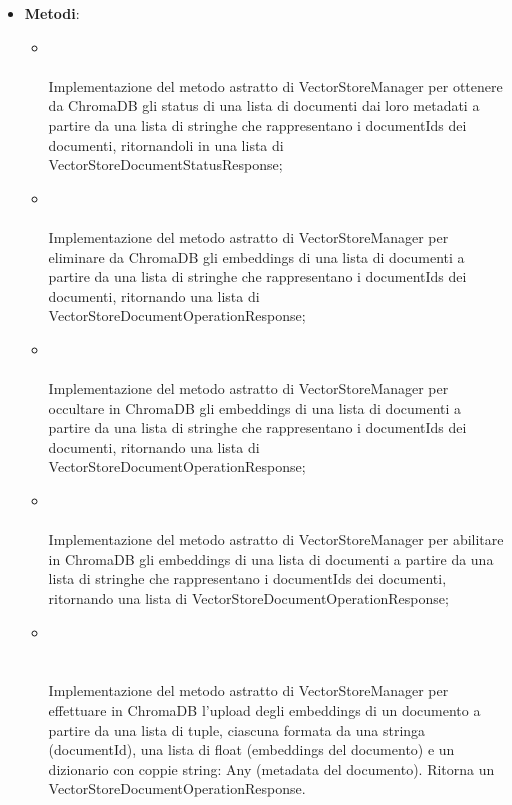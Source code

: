 \documentclass[10pt, a4paper]{article}
\begin{document}
    \label{VectorStoreChromaDBManagerDettaglio}
    \begin{itemize}
        \item \textbf{Metodi}:
        \begin{itemize}
            \item {}\\ \\
            Implementazione del metodo astratto di VectorStoreManager per ottenere da ChromaDB gli status di una lista di documenti dai loro metadati a partire da una lista di stringhe che rappresentano i documentIds dei documenti, ritornandoli in una lista di VectorStoreDocumentStatusResponse;
            \item {}\\ \\
            Implementazione del metodo astratto di VectorStoreManager per eliminare da ChromaDB gli embeddings di una lista di documenti a partire da una lista di stringhe che rappresentano i documentIds dei documenti, ritornando una lista di VectorStoreDocumentOperationResponse;
            \item {}\\ \\
            Implementazione del metodo astratto di VectorStoreManager per occultare in ChromaDB gli embeddings di una lista di documenti a partire da una lista di stringhe che rappresentano i documentIds dei documenti, ritornando una lista di VectorStoreDocumentOperationResponse;
            \item {}\\ \\
            Implementazione del metodo astratto di VectorStoreManager per abilitare in ChromaDB gli embeddings di una lista di documenti a partire da una lista di stringhe che rappresentano i documentIds dei documenti, ritornando una lista di VectorStoreDocumentOperationResponse;
            \item {}\\ \\ \\
            Implementazione del metodo astratto di VectorStoreManager per effettuare in ChromaDB l'upload degli embeddings di un documento a partire da una lista di tuple, ciascuna formata da una stringa (documentId), una lista di float (embeddings del documento) e un dizionario con coppie string: Any (metadata del documento). Ritorna un VectorStoreDocumentOperationResponse.
        \end{itemize}
    \end{itemize}
    
\end{document}
